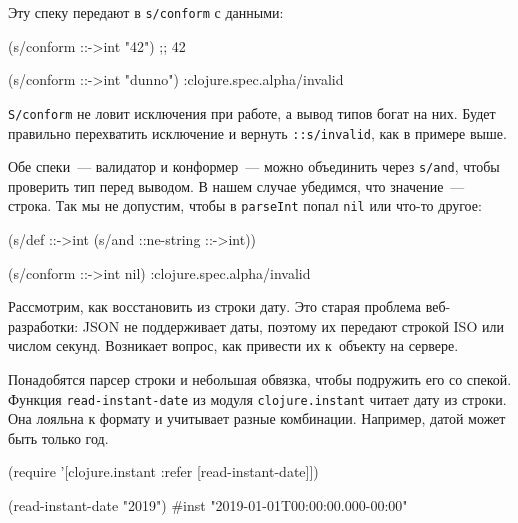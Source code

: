 \noindent
Эту спеку передают в \verb|s/conform| с данными:

\begin{english}
  \begin{clojure}
(s/conform ::->int "42") ;; 42

(s/conform ::->int "dunno")
:clojure.spec.alpha/invalid
  \end{clojure}
\end{english}


\verb|S/conform| не ловит исключения при работе, а вывод типов богат на
них. Будет правильно перехватить исключение и вернуть \verb|::s/invalid|, как
в примере выше.

Обе спеки~--- валидатор и конформер~--- можно объединить через \verb|s/and|,
чтобы проверить тип перед выводом. В нашем случае убедимся, что значение~---
строка. Так мы не допустим, чтобы в \verb|parseInt| попал \verb|nil| или
что-то другое:

\begin{english}
  \begin{clojure}
(s/def ::->int
  (s/and ::ne-string ::->int))

(s/conform ::->int nil)
:clojure.spec.alpha/invalid
  \end{clojure}
\end{english}


Рассмотрим, как восстановить из строки дату. Это старая проблема веб-разработки:
JSON не поддерживает даты, поэтому их передают строкой ISO или числом
секунд. Возникает вопрос, как привести их к~объекту на сервере.


Понадобятся парсер строки и небольшая обвязка, чтобы подружить его со
спекой. Функция \verb|read-instant-date| из модуля \verb|clojure.instant|
читает дату из строки. Она лояльна к формату и учитывает разные
комбинации. Например, датой может быть только год.


\begin{english}
  \begin{clojure}
(require '[clojure.instant :refer [read-instant-date]])

(read-instant-date "2019")
#inst "2019-01-01T00:00:00.000-00:00"
  \end{clojure}
\end{english}


